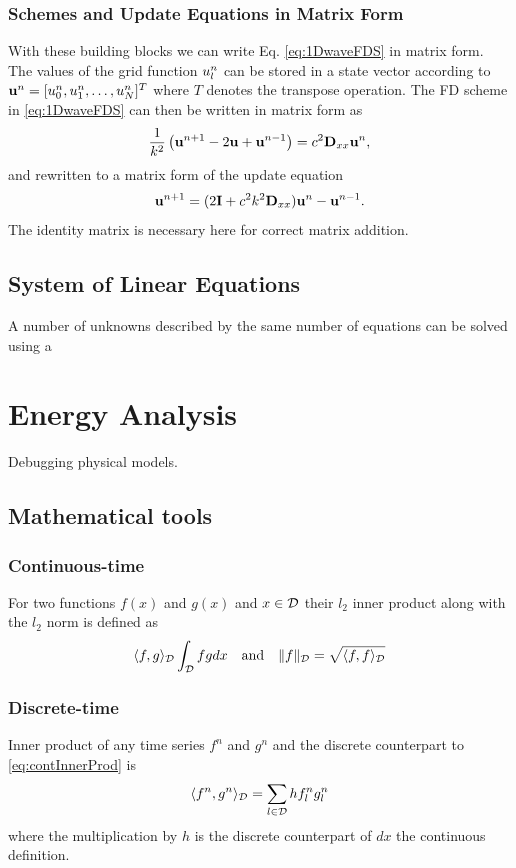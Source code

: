 \subsubsection{Schemes and Update Equations in Matrix Form}
With these building blocks we can write Eq. \eqref{eq:1DwaveFDS} in matrix form. The values of the grid function $u_l^n$ can be stored in a state vector according to $\mathbf{u}^n = [u_0^n, u_1^n, \hdots, u_N^n]^T$ where $T$ denotes the transpose operation. The FD scheme in \eqref{eq:1DwaveFDS} can then be written in matrix form as
\begin{equation}\label{eq:1DwaveMatrix}
    \frac{1}{k^2}\left(\mathbf{u}^{n+1} - 2 \mathbf{u} + \mathbf{u}^{n-1}\right) = c^2 \mathbf{D}_{xx} \mathbf{u}^n,
\end{equation}
and rewritten to a matrix form of the update equation
\begin{equation}
    \mathbf{u}^{n+1} = (2\mathbf{I} + c^2k^2 \mathbf{D}_{xx} )\mathbf{u}^n - \mathbf{u}^{n-1}.
\end{equation}
The identity matrix is necessary here for correct matrix addition.

\subsection{System of Linear Equations}
A number of unknowns described by the same number of equations can be solved using a 


\section{Energy Analysis}\label{sec:energyAnalysis}
Debugging physical models.

\subsection{Mathematical tools}
\subsubsection{Continuous-time}
For two functions $f(x)$ and $g(x)$ and $x\in\mathcal{D}$ their $l_2$ inner product along with the $l_2$ norm is defined as
\begin{equation}\label{eq:contInnerProd}
    \langle f, g\rangle_{\mathcal{D}} \int_{\mathcal{D}} fg dx \quad \text{and} \quad \lVert f \rVert_{\mathcal{D}} = \sqrt{\langle f, f \rangle_{\mathcal{D}}}
\end{equation}


\subsubsection{Discrete-time}
Inner product of any time series $f^n$ and $g^n$ and the discrete counterpart to \eqref{eq:contInnerProd} is
\begin{equation}\label{eq:discInnerProd}
    \langle f^n, g^n \rangle_{\mathcal{D}} = \sum_{l\in\mathcal{D}} h f_l^n g_l^n
\end{equation}
where the multiplication by $h$ is the discrete counterpart of $dx$ the continuous definition. 

